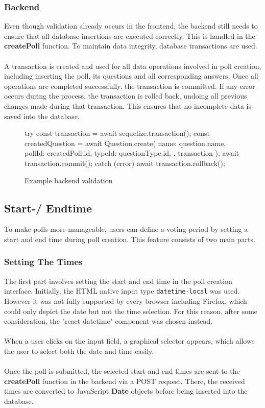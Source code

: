 \documentclass[a4paper,12pt]{report}
\begin{document}
\subsubsection{Backend}
Even though validation already occurs in the frontend, the backend still needs to ensure that all database insertions are executed correctly. This is handled in the \textbf{createPoll} function. To maintain data integrity, database transactions are used.\\\\
A transaction is created and used for all data operations involved in poll creation, including inserting the poll, its questions and all corresponding answers. Once all operations are completed successfully, the transaction is committed. If any error occurs during the process, the transaction is rolled back, undoing all previous changes made during that transaction. This ensures that no incomplete data is saved into the database.
\begin{figure}[H]
	\begin{code}
		try {
			const transaction = await sequelize.transaction();
			const createdQuestion = await Question.create({
				name: question.name,
				pollId: createdPoll.id,
				typeId: questionType.id,
			}, { transaction });
			await transaction.commit();
		} catch (error) {
			await transaction.rollback();
		}
	\end{code}
	\caption{Example backend validation}
	\label{fig:example-transaction}
\end{figure} 
\subsection{Start-/ Endtime}
To make polls more manageable, users can define a voting period by setting a start and end time during poll creation. This feature consists of two main parts.
\subsubsection{Setting The Times}
The first part involves setting the start and end time in the poll creation interface. Initially, the HTML native input type \texttt{datetime-local} was used. However it was not fully supported by every browser including Firefox, which could only depict the date but not the time selection. For this reason, after some consideration, the "react-datetime" component was chosen instead.\\\\
When a user clicks on the input field, a graphical selector appears, which allows the user to select both the date and time easily.\\\\
Once the poll is submitted, the selected start and end times are sent to the \textbf{createPoll} function in the backend via a POST request. There, the received times are converted to JavaScript \textbf{Date} objects before being inserted into the database.
\end{document}
